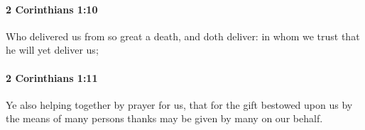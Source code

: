 		\paragraph{2 Corinthians 1:10} %
			\label{2CORINTHIANS-1-10}

			Who delivered us from so great a death, and doth deliver: in whom we trust that he will yet deliver us;

			\begin{framed}
			\scriptsize
				\begin{compactdesc}
					\item[SBLG] 
				\end{compactdesc}
			\end{framed}

		\paragraph{2 Corinthians 1:11} %
			\label{2CORINTHIANS-1-11}

			Ye also helping together by prayer for us, that for the gift bestowed upon us by the means of many persons thanks may be given by many on our behalf.

